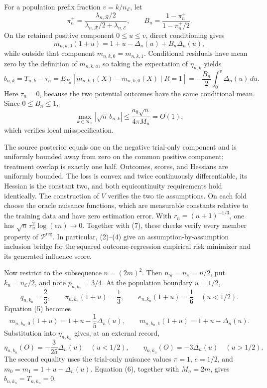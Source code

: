 For a population prefix fraction \(v=k/n_{\mathcal E}\), let
\[
 \pi_n^+=\frac{\lambda_{n,\mathcal R}/2}
 {\lambda_{n,\mathcal R}/2+\lambda_{n,\mathcal E}},
 \qquad
 B_n=\frac{1-\pi_n^+}{1-\pi_n^+/2}.
\]
On the retained positive component \(0\leq u\leq v\), direct conditioning gives
\[
 m_{n,k,0}(1+u)
 =1+u-\Delta_n(u)+B_n\Delta_n(u),
\tag{5}
\]
while outside that component \(m_{n,k,0}=m_{n,k,1}\).  Conditional residuals have mean zero by the definition of \(m_{n,k,a}\), so taking the expectation of \(\eta_{n,k}\) yields
\[
 b_{n,k}=T_{n,k}-\tau_n
 =E_{P_n}[m_{n,k,1}(X)-m_{n,k,0}(X)\mid R=1]
 =-\frac{B_n}{2}\int_0^v\Delta_n(u)\,du.
\tag{6}
\]
Here \(\tau_n=0\), because the two potential outcomes have the same conditional mean.  Since \(0\leq B_n\leq1\),
\[
 \max_{k\in\mathcal K_n}|\sqrt n\,b_{n,k}|
 \leq\frac{a_0\sqrt n}{4\pi M_n}=O(1),
\tag{7}
\]
which verifies local misspecification.

The source posterior equals one on the negative trial-only component and is uniformly bounded away from zero on the common positive component; treatment overlap is exactly one half.  Outcomes, scores, and Hessians are uniformly bounded.  The loss is convex and twice continuously differentiable, its Hessian is the constant two, and both equicontinuity requirements hold identically.  The construction of \(V\) verifies the two tie assumptions.  On each fold choose the oracle nuisance functions, which are measurable constants relative to the training data and have zero estimation error.  With \(r_n=(n+1)^{-1/3}\), one has \(\sqrt n\,r_n^2\log(en)\to0\).  Together with (7), these checks verify every member property of \(\mathcal P^{\mathrm{reg}}\).  In particular, (2)--(4) give an assumption-by-assumption inclusion bridge for the squared outcome-regression empirical risk minimizer and its generated influence score.

Now restrict to the subsequence \(n=(2m)^2\).  Then \(n_{\mathcal R}=n_{\mathcal E}=n/2\), put \(k_n=n_{\mathcal E}/2\), and note \(p_{n,k_n}=3/4\).  At the population boundary \(u=1/2\),
\[
 q_{n,k_n}=\frac23,
 \qquad \pi_{n,k_n}(1+u)=\frac13,
 \qquad e_{n,k_n}(1+u)=\frac16
 \quad (u<1/2).
\]
Equation (5) becomes
\[
 m_{n,k_n,0}(1+u)=1+u-\frac15\Delta_n(u),
 \qquad
 m_{n,k_n,1}(1+u)=1+u-\Delta_n(u).
\]
Substitution into \(\eta_{n,k_n}\) gives, at an external record,
\[
 \eta_{n,k_n}(O)=-\frac3{25}\Delta_n(u)\quad(u<1/2),
 \qquad
 \eta_{n,k_n}(O)=-3\Delta_n(u)\quad(u>1/2).
\tag{8}
\]
The second equality uses the trial-only nuisance values \(\pi=1\), \(e=1/2\), and \(m_0=m_1=1+u-\Delta_n(u)\).  Equation (6), together with \(M_n=2m\), gives \(b_{n,k_n}=T_{n,k_n}=0\).


